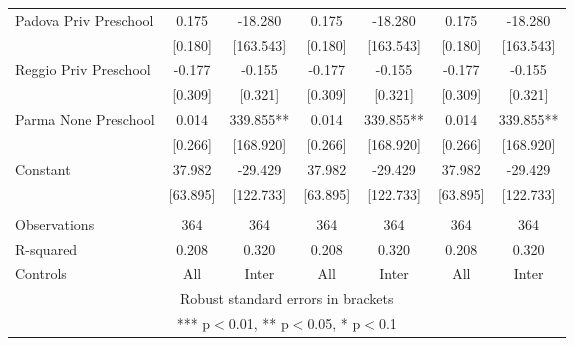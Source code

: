 \begin{tabular}{lcccccc}
Padova Priv Preschool & 0.175 & -18.280 & 0.175 & -18.280 & 0.175 & -18.280 \\
 & [0.180] & [163.543] & [0.180] & [163.543] & [0.180] & [163.543] \\
Reggio Priv Preschool & -0.177 & -0.155 & -0.177 & -0.155 & -0.177 & -0.155 \\
 & [0.309] & [0.321] & [0.309] & [0.321] & [0.309] & [0.321] \\
Parma None Preschool & 0.014 & 339.855** & 0.014 & 339.855** & 0.014 & 339.855** \\
 & [0.266] & [168.920] & [0.266] & [168.920] & [0.266] & [168.920] \\
Constant & 37.982 & -29.429 & 37.982 & -29.429 & 37.982 & -29.429 \\
 & [63.895] & [122.733] & [63.895] & [122.733] & [63.895] & [122.733] \\
 &  &  &  &  &  &  \\
Observations & 364 & 364 & 364 & 364 & 364 & 364 \\
R-squared & 0.208 & 0.320 & 0.208 & 0.320 & 0.208 & 0.320 \\
 Controls & All & Inter & All & Inter & All & Inter \\ \hline
\multicolumn{7}{c}{ Robust standard errors in brackets} \\
\multicolumn{7}{c}{ *** p$<$0.01, ** p$<$0.05, * p$<$0.1} \\
\end{tabular}
